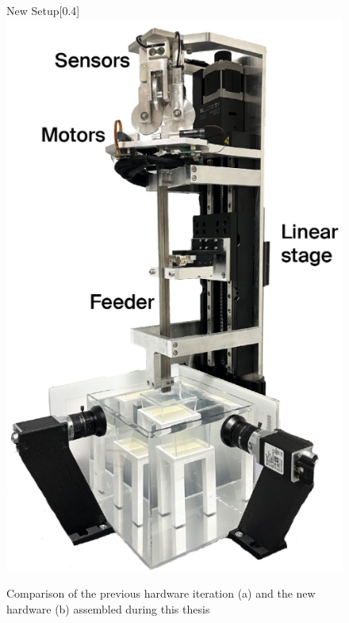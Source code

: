 \begin{figure}[H]
\begin{subcaptionbox}{New Setup\label{fig:right}}[0.4\linewidth]
        {\includegraphics[width=\linewidth]{images/Hardware/insertionStrategy.PNG}}
    \end{subcaptionbox}
    \caption{Comparison of the previous hardware iteration (a) and the new hardware (b) assembled during this thesis}
    \label{fig:hardwarecompare}
\end{figure}


